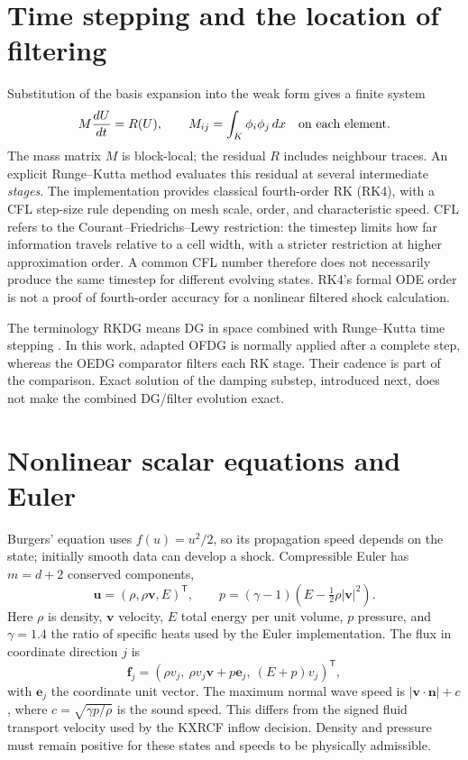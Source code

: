 \section{Time stepping and the location of filtering}
Substitution of the basis expansion into the weak form gives a finite system
\begin{equation}
 M\frac{dU}{dt}=R(U),
 \qquad M_{ij}=\int_K\phi_i\phi_j\,dx\quad\hbox{on each element}.
\end{equation}
The mass matrix $M$ is block-local; the residual $R$ includes neighbour traces.
An explicit Runge--Kutta method evaluates this residual at several intermediate
\emph{stages}. The implementation provides classical fourth-order RK (RK4), with a CFL
step-size rule depending on mesh scale, order, and characteristic speed.
CFL refers to the Courant--Friedrichs--Lewy restriction: the timestep limits
how far information travels relative to a cell width, with a stricter
restriction at higher approximation order. A common CFL number therefore does
not necessarily produce the same timestep for different evolving states.
RK4's formal ODE order is not a proof of fourth-order accuracy for a nonlinear
filtered shock calculation.

The terminology RKDG means DG in space combined with Runge--Kutta time stepping
\cite{LuEtAl2021,LiuEtAl2022}. In this work, adapted OFDG is normally
applied after a complete step, whereas the OEDG comparator filters each RK
stage. Their cadence is part of the comparison. Exact solution of the damping
substep, introduced next, does not make the combined DG/filter evolution exact.

\section{Nonlinear scalar equations and Euler}
Burgers' equation uses $f(u)=u^2/2$, so its propagation speed depends on the
state; initially smooth data can develop a shock. Compressible Euler has
$m=d+2$ conserved components,
\begin{equation}
 \boldsymbol u=(\rho,\rho\boldsymbol v,E)^\mathsf T,
 \qquad p=(\gamma-1)\left(E-\tfrac12\rho|\boldsymbol v|^2\right).
 \label{eq:euler-state}
\end{equation}
Here $\rho$ is density, $\boldsymbol v$ velocity, $E$ total energy per unit
volume, $p$ pressure, and $\gamma=1.4$ the ratio of specific heats used by the Euler implementation.
The flux in coordinate direction $j$ is
\begin{equation}
 \boldsymbol f_j=(\rho v_j,\ \rho v_j\boldsymbol v+p\boldsymbol e_j,\ (E+p)v_j)^\mathsf T,
 \label{eq:euler-flux}
\end{equation}
with $\boldsymbol e_j$ the coordinate unit vector. The maximum normal wave
speed is $|\boldsymbol v\cdot\boldsymbol n|+c$, where
$c=\sqrt{\gamma p/\rho}$ is the sound speed. This differs from the signed
fluid transport velocity used by the KXRCF inflow decision. Density and pressure
must remain positive for these states and speeds to be physically admissible.
